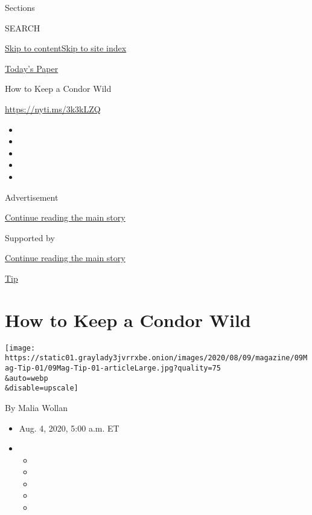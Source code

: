 Sections

SEARCH

\protect\hyperlink{site-content}{Skip to
content}\protect\hyperlink{site-index}{Skip to site index}

\href{https://myaccount.nytimes3xbfgragh.onion/auth/login?response_type=cookie\&client_id=vi}{}

\href{https://www.nytimes3xbfgragh.onion/section/todayspaper}{Today's
Paper}

How to Keep a Condor Wild

\url{https://nyti.ms/3k3kLZQ}

\begin{itemize}
\item
\item
\item
\item
\item
\end{itemize}

Advertisement

\protect\hyperlink{after-top}{Continue reading the main story}

Supported by

\protect\hyperlink{after-sponsor}{Continue reading the main story}

\href{/column/magazine-tip}{Tip}

\hypertarget{how-to-keep-a-condor-wild}{%
\section{How to Keep a Condor Wild}\label{how-to-keep-a-condor-wild}}

\texttt{[image: https://static01.graylady3jvrrxbe.onion/images/2020/08/09/magazine/09Mag-Tip-01/09Mag-Tip-01-articleLarge.jpg?quality=75\\\&auto=webp\\\&disable=upscale]}

By Malia Wollan

\begin{itemize}
\item
  Aug. 4, 2020, 5:00 a.m. ET
\item
  \begin{itemize}
  \item
  \item
  \item
  \item
  \item
  \end{itemize}
\end{itemize}

